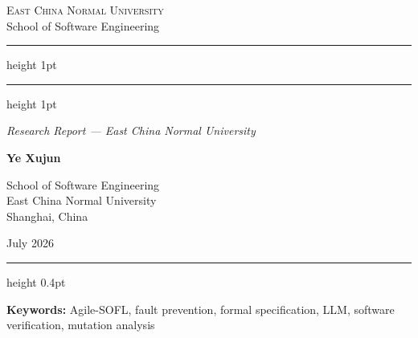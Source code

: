 \begin{titlepage}
\thispagestyle{empty}
\centering

\vspace*{2.5cm}

{\large\scshape East China Normal University}\\[0.5em]
{\normalsize School of Software Engineering}

\vspace{2cm}
\hrule height 1pt
\vspace{0.8cm}


\vspace{0.8cm}
\hrule height 1pt

\vspace{1.2cm}

{\large\itshape Research Report --- East China Normal University}

\vspace{2cm}

{\Large\bfseries Ye Xujun}

\vspace{0.8cm}

{\normalsize
School of Software Engineering\\
East China Normal University\\
Shanghai, China
}

\vspace{1.5cm}

{\large July 2026}

\vfill

\hrule height 0.4pt
\vspace{0.5cm}

{\small\bfseries Keywords:} {\small Agile-SOFL, fault prevention, formal specification,
LLM, software verification, mutation analysis}

\vspace{0.5cm}

\end{titlepage}
